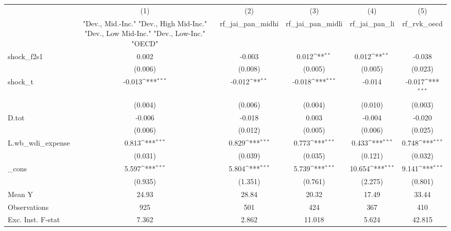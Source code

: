 {
\def\sym#1{\ifmmode^{#1}\else\(^{#1}\)\fi}
\begin{tabular}{l*{5}{c}}
\toprule
            &\multicolumn{1}{c}{(1)}&\multicolumn{1}{c}{(2)}&\multicolumn{1}{c}{(3)}&\multicolumn{1}{c}{(4)}&\multicolumn{1}{c}{(5)}\\
            &\multicolumn{1}{c}{ "Dev., Mid.-Inc." "Dev., High Mid-Inc." "Dev., Low Mid-Inc." "Dev., Low-Inc." "OECD" }&\multicolumn{1}{c}{rf\_jai\_pan\_midhi}&\multicolumn{1}{c}{rf\_jai\_pan\_midli}&\multicolumn{1}{c}{rf\_jai\_pan\_li}&\multicolumn{1}{c}{rf\_rvk\_oecd}\\
\midrule
shock\_f2s1  &       0.002         &      -0.003         &       0.012\sym{**} &       0.012\sym{**} &      -0.038         \\
            &     (0.006)         &     (0.008)         &     (0.005)         &     (0.005)         &     (0.023)         \\
\addlinespace
shock\_t     &      -0.013\sym{***}&      -0.012\sym{**} &      -0.018\sym{***}&      -0.014         &      -0.017\sym{***}\\
            &     (0.004)         &     (0.006)         &     (0.004)         &     (0.010)         &     (0.003)         \\
\addlinespace
D.tot       &      -0.006         &      -0.018         &       0.003         &      -0.004         &      -0.020         \\
            &     (0.006)         &     (0.012)         &     (0.005)         &     (0.006)         &     (0.025)         \\
\addlinespace
L.wb\_wdi\_expense&       0.813\sym{***}&       0.829\sym{***}&       0.773\sym{***}&       0.433\sym{***}&       0.748\sym{***}\\
            &     (0.031)         &     (0.039)         &     (0.035)         &     (0.121)         &     (0.032)         \\
\addlinespace
\_cons      &       5.597\sym{***}&       5.804\sym{***}&       5.739\sym{***}&      10.654\sym{***}&       9.141\sym{***}\\
            &     (0.935)         &     (1.351)         &     (0.761)         &     (2.275)         &     (0.801)         \\
\midrule
Mean Y      &       24.93         &       28.84         &       20.32         &       17.49         &       33.44         \\
Observations&         925         &         501         &         424         &         367         &         410         \\
Exc. Inst. F-stat&       7.362         &       2.862         &      11.018         &       5.624         &      42.815         \\
\bottomrule
\end{tabular}
}

